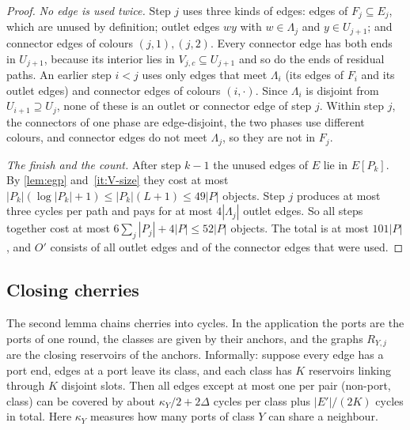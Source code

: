 \documentclass[11pt]{article}
\theoremstyle{definition}
\theoremstyle{remark}
\numberwithin{equation}{section}
\numberwithin{figure}{section}
\numberwithin{table}{section}
\begin{document}
\begin{proof}
\emph{No edge is used twice.} Step $j$ uses three kinds of edges: edges of
$F_j\subseteq E_j$, which are unused by definition; outlet edges $wy$ with
$w\in\Lambda_j$ and $y\in U_{j+1}$; and connector edges of colours $(j,1),(j,2)$.
Every connector edge has both ends in $U_{j+1}$, because its interior lies in
$V_{j,c}\subseteq U_{j+1}$ and so do the ends of residual paths. An earlier step
$i<j$ uses only edges that meet $\Lambda_i$ (its edges of $F_i$ and its
outlet edges) and connector edges of colours $(i,\cdot)$. Since $\Lambda_i$
is disjoint from $U_{i+1}\supseteq U_j$, none of these is an outlet or
connector edge of step $j$. Within step $j$, the connectors of one phase are
edge-disjoint, the two phases use different colours, and connector edges do not
meet $\Lambda_j$, so they are not in $F_j$.

\emph{The finish and the count.} After step $k-1$ the unused edges of $E$
lie in $E[P_k]$. By \cref{lem:egp} and~\ref{it:V-size} they cost at most
$|P_k|(\log|P_k|+1)\le|P_k|(L+1)\le49|P|$ objects. Step $j$ produces at most
three cycles per path and pays for at most $4|\Lambda_j|$ outlet edges. So all
steps together cost at most $6\sum_j|P_j|+4|P|\le52|P|$ objects. The total is
at most $101|P|$, and $O'$ consists of all outlet edges and of the connector
edges that were used.
\end{proof}


\subsection{Closing cherries}

The second lemma chains cherries into cycles. In the application the ports are
the ports of one round, the classes are given by their anchors, and the graphs
$R_{Y,j}$ are the closing reservoirs of the anchors. Informally: suppose every
edge has a port end, edges at a port leave its class, and each class has $K$
reservoirs linking through $K$ disjoint slots. Then all edges except at most
one per pair (non-port, class) can be covered by about $\kappa_Y/2+2\Delta$
cycles per class plus $|E'|/(2K)$ cycles in total.
Here $\kappa_Y$ measures how many ports of class $Y$ can share a neighbour.
\end{document}
